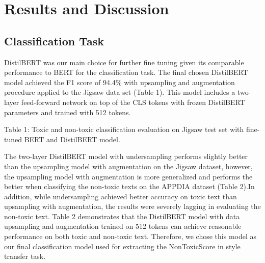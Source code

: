 \documentclass[11pt]{article}
\begin{document}
\section{Results and Discussion}

\subsection{Classification Task}

DistilBERT was our main choice for further fine tuning given its comparable performance to BERT for the classification task. The final chosen DistilBERT model achieved the F1 score of 94.4\% with upsampling and augmentation procedure applied to the Jigsaw data set (Table 1). This model includes a two-layer feed-forward network on top of the CLS tokens with frozen DistilBERT parameters and trained with 512 tokens.

\begin{table*}[ht]
\centering
{}
Table 1: Toxic and non-toxic classification evaluation on Jigsaw test set with fine-tuned BERT and DistilBERT model.  
\end{table*}

The two-layer DistilBERT model with undersampling performs slightly better than the upsampling model with augmentation on the Jigsaw dataset, however, the upsampling model with augmentation is more generalized and performs the better when classifying the non-toxic texts on the APPDIA dataset (Table 2).In addition, while undersampling achieved better accuracy on toxic text than upsampling with augmentation, the results were severely lagging in evaluating the non-toxic text. Table 2 demonstrates that the DistilBERT model with data upsampling and augmentation trained on 512 tokens can achieve reasonable performance on both toxic and non-toxic text. Therefore, we chose this model as our final classification model used for extracting the NonToxicScore in style transfer task.
\end{document}
